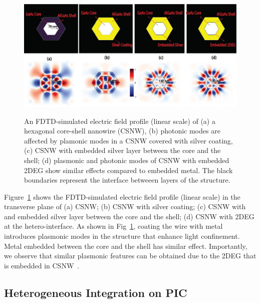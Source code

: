 \begin{figure}
  \caption[An FDTD-simulated electric field profile of (a) a hexagonal core-shell nanowire (CSNW), (b) CSNW covered with silver coating, (c) CSNW with embeded silver layer between the core and the shell, (d) CSNW with embedded 2DEG.]{An FDTD-simulated electric field profile (linear scale) of (a) a hexagonal core-shell nanowire (CSNW), (b) photonic modes are affected by plamonic modes in a CSNW covered with silver coating, (c) CSNW with embedded silver layer between the core and the shell; (d) plasmonic and photonic modes of CSNW with embedded 2DEG show similar effects compared to embedded metal. The black boundaries represent the interface betweeen layers of the structure.}
  \centering
  \includegraphics[width=\textwidth]{pictures/Conclusion/PlasmonMode}
  \label{PlasmonMode}
\end{figure}

Figure~\ref{PlasmonMode} shows the FDTD-simulated electric field profile
(linear scale) in the transverse plane of (a) CSNW; (b) CSNW with silver
coating; (c) CSNW with and embedded silver layer between the core and the
shell; (d) CSNW with 2DEG at the hetero-interface. As shown in
Fig~\ref{PlasmonMode}, coating the wire with metal introduces plasmonic modes
in the structure that enhance light confinement. Metal embedded between the
core and the shell has similar effect. Importantly, we observe that similar
plasmonic features can be obtained due to the 2DEG that is embedded in
CSNW~\cite{montazeri2016plasmonic}.

\subsection{Heterogeneous Integration on PIC}

